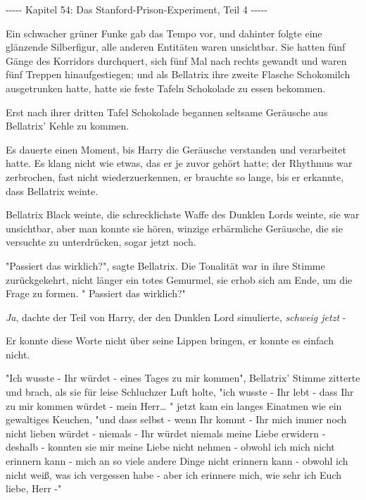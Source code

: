 

\hypertarget{das-stanford-prison-experiment-teil-4}{%

-\/-\/-\/-\/- Kapitel 54: Das Stanford-Prison-Experiment, Teil 4 -\/-\/-\/-\/-

Ein schwacher grüner Funke gab das Tempo vor, und dahinter folgte eine glänzende Silberfigur, alle anderen Entitäten waren unsichtbar. Sie hatten fünf Gänge des Korridors durchquert, sich fünf Mal nach rechts gewandt und waren fünf Treppen hinaufgestiegen; und als Bellatrix ihre zweite Flasche Schokomilch ausgetrunken hatte, hatte sie feste Tafeln Schokolade zu essen bekommen.

Erst nach ihrer dritten Tafel Schokolade begannen seltsame Geräusche aus Bellatrix' Kehle zu kommen.

Es dauerte einen Moment, bis Harry die Geräusche verstanden und verarbeitet hatte. Es klang nicht wie etwas, das er je zuvor gehört hatte; der Rhythmus war zerbrochen, fast nicht wiederzuerkennen, er brauchte so lange, bis er erkannte, dass Bellatrix weinte.

Bellatrix Black weinte, die schrecklichste Waffe des Dunklen Lords weinte, sie war unsichtbar, aber man konnte sie hören, winzige erbärmliche Geräusche, die sie versuchte zu unterdrücken, sogar jetzt noch.

"Passiert das wirklich?", sagte Bellatrix. Die Tonalität war in ihre Stimme zurückgekehrt, nicht länger ein totes Gemurmel, sie erhob sich am Ende, um die Frage zu formen. " Passiert das wirklich?"

\emph{Ja}, dachte der Teil von Harry, der den Dunklen Lord simulierte, \emph{schweig jetzt} -

Er konnte diese Worte nicht über seine Lippen bringen, er konnte es einfach nicht.

"Ich wusste - Ihr würdet - eines Tages zu mir kommen", Bellatrix' Stimme zitterte und brach, als sie für leise Schluchzer Luft holte, "ich wusste - Ihr lebt - dass Ihr zu mir kommen würdet - mein Herr… " jetzt kam ein langes Einatmen wie ein gewaltiges Keuchen, "und dass selbst - wenn Ihr kommt - Ihr mich immer noch nicht lieben würdet - niemals - Ihr würdet niemals meine Liebe erwidern - deshalb - konnten sie mir meine Liebe nicht nehmen - obwohl ich mich nicht erinnern kann - mich an so viele andere Dinge nicht erinnern kann - obwohl ich nicht weiß, was ich vergessen habe - aber ich erinnere mich, wie sehr ich Euch liebe, Herr -"

}
